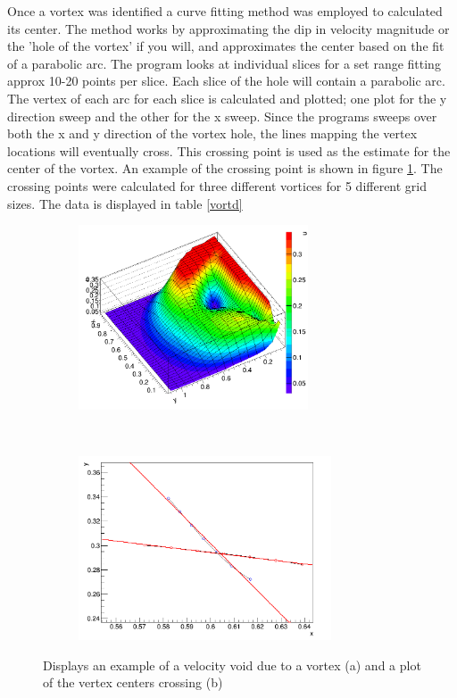 \documentclass[paper=a4, fontsize=11pt, abstract=on]{scrartcl}
\numberwithin{equation}{section}		%
\numberwithin{figure}{section}			%
\numberwithin{table}{section}				%
\begin{document}
 Once a vortex was identified a curve fitting method was employed to calculated its center. The method works by approximating the dip in velocity magnitude or the 'hole of the vortex' if you will, and approximates the center based on the fit of a parabolic arc. The program looks at individual slices for a set range fitting approx 10-20 points per slice. Each slice of the hole will contain a parabolic arc. The vertex of each arc for each slice is calculated and plotted; one plot for the y direction sweep and the other for the x sweep. Since the programs sweeps over both the x and y direction of the vortex hole, the lines mapping the vertex locations will eventually cross. This crossing point is used as the estimate for the center of the vortex. An example of the crossing point is shown in figure \ref{cross}. The crossing points were calculated for three different vortices for 5 different grid sizes. The data is displayed in table \ref{vortd}



\begin{figure}[H]
        \centering
        \begin{subfigure}[h]{0.5\textwidth}
                \includegraphics[width = 6.8cm]{para}
                \caption{}
				
        \end{subfigure}%
       ~~~~~
        \begin{subfigure}[h]{0.5\textwidth}
                \includegraphics[width = 7.5cm]{cross}
                \caption{}
                
        \end{subfigure}
        \caption{Displays an example of a velocity void due to a vortex (a) and a plot of the vertex centers crossing (b)}
        \label{cross}
\end{figure}
\end{document}
